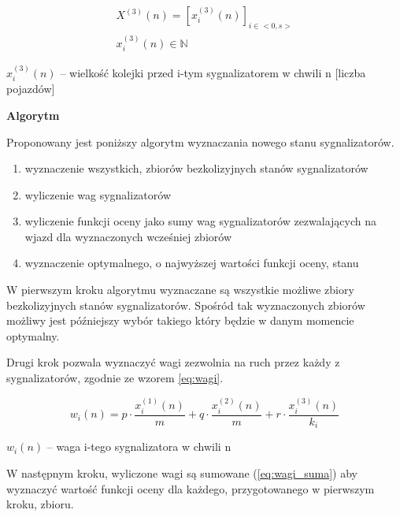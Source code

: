 \begin{equation}
	\begin{array}{c}
		X^{(3)} (n) = \left[ x^{(3)}_{i} (n) \right]_{i \in <0,s>}\\
		x^{(3)}_{i} (n) \in \mathbb{N}
	\end{array}
\end{equation}

\begin{math} x^{(3)}_{i} (n) \end{math} \textrm{ -- wielkość kolejki przed i-tym sygnalizatorem w chwili n [liczba pojazdów]}

\vspace{1.5cm}
\textbf{Algorytm}

Proponowany jest poniższy algorytm wyznaczania nowego stanu sygnalizatorów.
\begin{enumerate}
	\item wyznaczenie wszystkich, zbiorów bezkolizyjnych stanów sygnalizatorów
	\item wyliczenie wag sygnalizatorów
	\item wyliczenie funkcji oceny jako sumy wag sygnalizatorów zezwalających na wjazd dla wyznaczonych wcześniej zbiorów
	\item wyznaczenie optymalnego, o najwyższej wartości funkcji oceny, stanu
\end{enumerate}

\vspace{0.5cm}
W pierwszym kroku algorytmu wyznaczane są wszystkie możliwe zbiory bezkolizyjnych stanów sygnalizatorów.
Spośród tak wyznaczonych zbiorów możliwy jest późniejszy wybór takiego który będzie w danym momencie optymalny.

\vspace{0.5cm}
Drugi krok pozwala wyznaczyć wagi zezwolnia na ruch przez każdy z sygnalizatorów, zgodnie ze wzorem \ref{eq:wagi}.

\begin{equation}
\label{eq:wagi}
	w_{i} (n) = p \cdot \frac{x^{(1)}_{i} (n)}{m} + q \cdot \frac{x^{(2)}_{i} (n)}{m} + r \cdot \frac{x^{(3)}_{i} (n)}{k_{i}}
\end{equation}

\begin{math} w_{i} (n) \end{math} \textrm{ -- waga i-tego sygnalizatora w chwili n}

\vspace{0.5cm}
W następnym kroku, wyliczone wagi są sumowane (\ref{eq:wagi_suma}) aby wyznaczyć wartość funkcji oceny dla każdego, przygotowanego w pierwszym kroku, zbioru.

